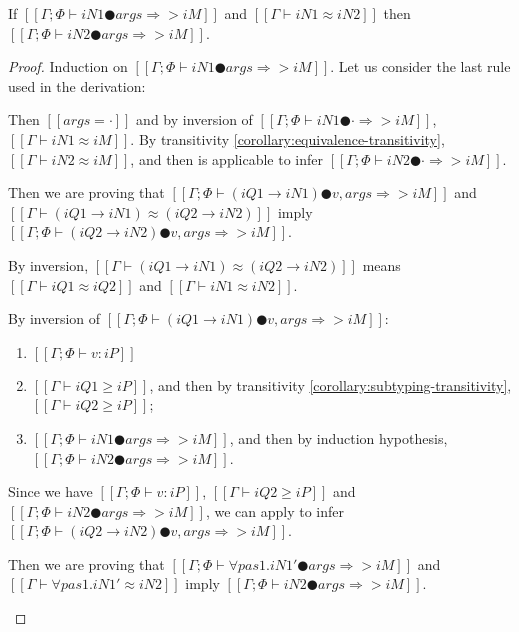 \begin{lemma} \label{lemma:app-inf-equ-stable}
    If $[[Γ; Φ ⊢ iN1 ● args ⇒> iM]]$ and $[[Γ ⊢ iN1 ≈ iN2]]$ 
    then $[[Γ; Φ ⊢ iN2 ● args ⇒> iM]]$.
\end{lemma}
\begin{proof}
    Induction on $[[Γ; Φ ⊢ iN1 ● args ⇒> iM]]$.
    Let us consider the last rule used in the derivation:
    \begin{caseof}
        \item {}
            Then $[[args = ·]]$ and by inversion of $[[Γ; Φ ⊢ iN1 ● · ⇒> iM]]$,
            $[[Γ ⊢ iN1 ≈ iM]]$.
            By transitivity \cref{corollary:equivalence-transitivity}, 
            $[[Γ ⊢ iN2 ≈ iM]]$, and then  is applicable to infer
            $[[Γ; Φ ⊢ iN2 ● · ⇒> iM]]$.
        \item {}
            Then we are proving that  
            $[[Γ; Φ ⊢ (iQ1 → iN1) ● v, args ⇒> iM]]$ and $[[Γ ⊢ (iQ1 → iN1) ≈ (iQ2 → iN2)]]$
            imply $[[Γ; Φ ⊢ (iQ2 → iN2) ● v, args ⇒> iM]]$.
            
            By inversion, $[[Γ ⊢ (iQ1 → iN1) ≈ (iQ2 → iN2)]]$
            means $[[Γ ⊢ iQ1 ≈ iQ2]]$ and $[[Γ ⊢ iN1 ≈ iN2]]$.

            By inversion of $[[Γ; Φ ⊢ (iQ1 → iN1) ● v, args ⇒> iM]]$:
            \begin{enumerate}
                \item $[[Γ ; Φ ⊢ v : iP]]$
                \item $[[Γ ⊢ iQ1 ≥ iP]]$,
                    and then by transitivity \cref{corollary:subtyping-transitivity},
                    $[[Γ ⊢ iQ2 ≥ iP]]$;
                \item $[[Γ ; Φ ⊢ iN1 ● args ⇒> iM]]$, 
                    and then by induction hypothesis, $[[Γ ; Φ ⊢ iN2 ● args ⇒> iM]]$.
            \end{enumerate}

            Since we have $[[Γ ; Φ ⊢ v : iP]]$, $[[Γ ⊢ iQ2 ≥ iP]]$ and 
            $[[Γ ; Φ ⊢ iN2 ● args ⇒> iM]]$, we can apply 
            to infer $[[Γ; Φ ⊢ (iQ2 → iN2) ● v, args ⇒> iM]]$.
        \item {}
            Then we are proving that 
            $[[Γ ; Φ ⊢ ∀pas1.iN1' ● args ⇒> iM]]$ and $[[Γ ⊢ ∀pas1.iN1' ≈ iN2]]$
            imply $[[Γ ; Φ ⊢ iN2 ● args ⇒> iM]]$.


\end{caseof}
\end{proof}
